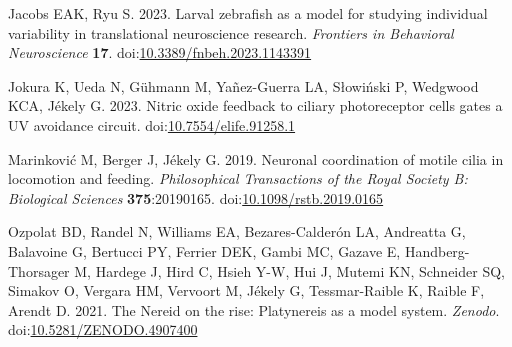 \documentclass[
  11pt,
]{article}
\newlength{\cslhangindent}
\newenvironment{CSLReferences}[2] %
 {\begin{list}{}{%
  \setlength{\itemindent}{0pt}
  \setlength{\leftmargin}{0pt}
  \setlength{\parsep}{0pt}
  \ifodd #1
   \setlength{\leftmargin}{\cslhangindent}
   \setlength{\itemindent}{-1\cslhangindent}
  \fi
  \setlength{\itemsep}{#2\baselineskip}}}
 {\end{list}}
\begin{document}
\label{refs}
\begin{CSLReferences}{1}{0}
Jacobs EAK, Ryu S. 2023. Larval zebrafish as a model for studying
individual variability in translational neuroscience research.
\emph{Frontiers in Behavioral Neuroscience} \textbf{17}.
doi:\href{https://doi.org/10.3389/fnbeh.2023.1143391}{10.3389/fnbeh.2023.1143391}

Jokura K, Ueda N, Gühmann M, Yañez-Guerra LA, Słowiński P, Wedgwood KCA,
Jékely G. 2023. Nitric oxide feedback to ciliary photoreceptor cells
gates a UV avoidance circuit.
doi:\href{https://doi.org/10.7554/elife.91258.1}{10.7554/elife.91258.1}

Marinković M, Berger J, Jékely G. 2019. Neuronal coordination of motile
cilia in locomotion and feeding. \emph{Philosophical Transactions of the
Royal Society B: Biological Sciences} \textbf{375}:20190165.
doi:\href{https://doi.org/10.1098/rstb.2019.0165}{10.1098/rstb.2019.0165}

Ozpolat BD, Randel N, Williams EA, Bezares-Calderón LA, Andreatta G,
Balavoine G, Bertucci PY, Ferrier DEK, Gambi MC, Gazave E,
Handberg-Thorsager M, Hardege J, Hird C, Hsieh Y-W, Hui J, Mutemi KN,
Schneider SQ, Simakov O, Vergara HM, Vervoort M, Jékely G,
Tessmar-Raible K, Raible F, Arendt D. 2021. The Nereid on the rise:
Platynereis as a model system. \emph{Zenodo}.
doi:\href{https://doi.org/10.5281/ZENODO.4907400}{10.5281/ZENODO.4907400}

\end{CSLReferences}
\end{document}
